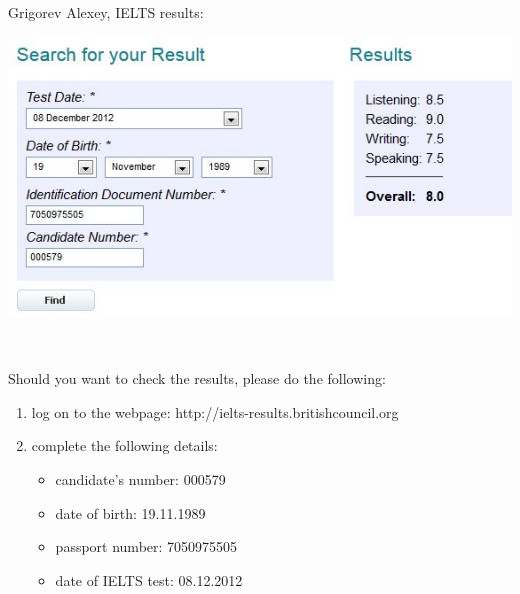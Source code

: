 \documentclass[a4paper,12pt]{article}
\begin{document}
Grigorev Alexey, IELTS results:


\includegraphics[scale=0.75]{ieltsresult.jpg}


\

Should you want to check the results, please do the following:

\begin{enumerate}
  \item log on to the webpage: http://ielts-results.britishcouncil.org
  \item complete the following details:

  \begin{itemize}
    \item candidate's number: 000579
    \item date of birth: 19.11.1989
    \item passport number: 7050975505
    \item date of IELTS test: 08.12.2012
  \end{itemize}
\end{enumerate}
\end{document}
